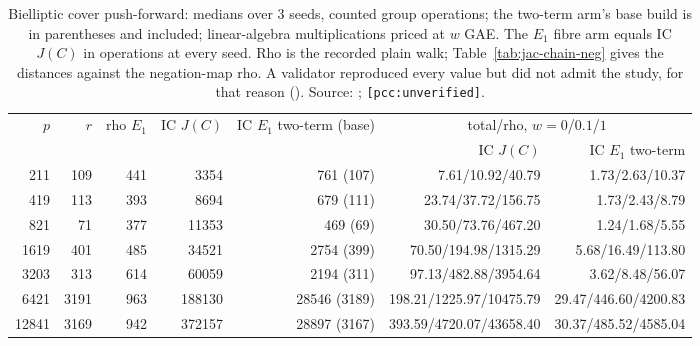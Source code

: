 \begin{table}[t]
\centering\footnotesize
\begin{tabular}{@{}rrrrrrr@{}}
\toprule
$p$ & $r$ & rho $E_1$ & IC $J(C)$ & IC $E_1$ two-term (base) & \multicolumn{2}{c}{total/rho, $w=0$/$0.1$/$1$} \\
 & & & & & IC $J(C)$ & IC $E_1$ two-term \\
\midrule
211 & 109 & 441 & 3354 & 761 (107) & 7.61/10.92/40.79 & 1.73/2.63/10.37 \\
419 & 113 & 393 & 8694 & 679 (111) & 23.74/37.72/156.75 & 1.73/2.43/8.79 \\
821 & 71 & 377 & 11353 & 469 (69) & 30.50/73.76/467.20 & 1.24/1.68/5.55 \\
1619 & 401 & 485 & 34521 & 2754 (399) & 70.50/194.98/1315.29 & 5.68/16.49/113.80 \\
3203 & 313 & 614 & 60059 & 2194 (311) & 97.13/482.88/3954.64 & 3.62/8.48/56.07 \\
6421 & 3191 & 963 & 188130 & 28546 (3189) & 198.21/1225.97/10475.79 & 29.47/446.60/4200.83 \\
12841 & 3169 & 942 & 372157 & 28897 (3167) & 393.59/4720.07/43658.40 & 30.37/485.52/4585.04 \\
\bottomrule
\end{tabular}
\caption[]{Bielliptic cover push-forward: medians over 3 seeds, counted
group operations; the two-term arm's base build is in parentheses and
included; linear-algebra multiplications priced at $w$ GAE. The $E_1$ fibre
arm equals IC $J(C)$ in operations at every seed. Rho is the recorded plain
walk; Table~\ref{tab:jac-chain-neg} gives the distances against the
negation-map rho. A validator reproduced every value but did not admit the
study, for that reason ().
Source: ;
\texttt{[pcc:unverified]}.}
\label{tab:obs-pushforward}
\end{table}

